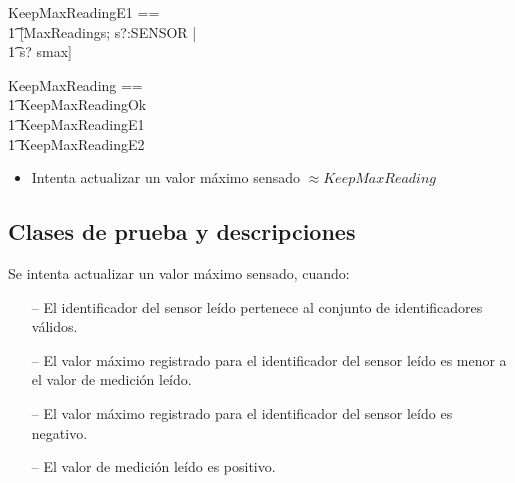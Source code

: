 \begin{zed}
KeepMaxReadingE1 == \\
  \t1 [\Xi MaxReadings; s?:SENSOR | \\
  \t1 s? \notin \dom smax]
\end{zed}


\begin{zed}
KeepMaxReading == \\
  \t1 KeepMaxReadingOk \\
  \t1 \lor KeepMaxReadingE1 \\
  \t1 \lor KeepMaxReadingE2
\end{zed}

\begin{itemize}
  \item Intenta actualizar un valor máximo sensado $\approx KeepMaxReading$
\end{itemize}

\subsection*{Clases de prueba y descripciones}


\begin{tcolorbox}[colback=gray!5!white,colframe=gray!50!black,
  colbacktitle=gray!75!black,title=KeepMaxReading\_SP\_3]
  Se intenta actualizar un valor máximo sensado, cuando:
     \begin{itemize}
  	    \item[--]{El identificador del sensor leído pertenece al conjunto de identificadores válidos.}
  	    \item[--]{El valor máximo registrado para el identificador del sensor leído es menor a el valor de medición leído.}
	      \item[--]{El valor máximo registrado para el identificador del sensor leído es negativo.}
	      \item[--]{El valor de medición leído es positivo.}
     \end{itemize}
\end{tcolorbox}

